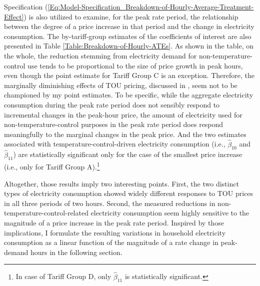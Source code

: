 Specification (\ref{Eq:Model-Specification_Breakdown-of-Hourly-Average-Treatment-Effect}) is also utilized to examine, for the peak rate period, the relationship between the degree of a price increase in that period and the change in electricity consumption. The by-tariff-group estimates of the coefficients of interest are also presented in Table \ref{Table:Breakdown-of-Hourly-ATEs}. As shown in the table, on the whole, the reduction stemming from electricity demand for non-temperature-control use tends to be proportional to the size of price growth in peak hours, even though the point estimate for Tariff Group C is an exception. Therefore, the marginally diminishing effects of TOU pricing, discussed in \cite{Peaking-Interest:How-Awareness-Drives-the-Effectiveness-of-Time-of-Use-Electricity-Pricing_Prest_2020}, seem not to be championed by my point estimates. To be specific, while the aggregate electricity consumption during the peak rate period does not sensibly respond to incremental changes in the peak-hour price, the amount of electricity used for non-temperature-control purposes in the peak rate period does respond meaningfully to the marginal changes in the peak price. And the two estimates associated with temperature-control-driven electricity consumption (i.e., $\hat{\beta}_{10}$ and $\hat{\beta}_{11}$) are statistically significant only for the case of the smallest price increase (i.e., only for Tariff Group A).\footnote{In case of Tariff Group D, only $\hat{\beta}_{11}$ is statistically significant.} 

Altogether, those results imply two interesting points. First, the two distinct types of electricity consumption showed widely different responses to TOU prices in all three periods of two hours. Second, the measured reductions in non-temperature-control-related electricity consumption seem highly sensitive to the magnitude of a price increase in the peak rate period. Inspired by those implications, I formulate the resulting variations in household electricity consumption as a linear function of the magnitude of a rate change in peak-demand hours in the following section.
